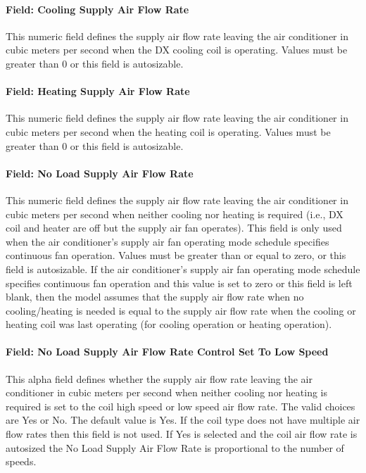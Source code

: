\paragraph{Field: Cooling Supply Air Flow Rate}\label{field-cooling-supply-air-flow-rate-002}

This numeric field defines the supply air flow rate leaving the air conditioner in cubic meters per second when the DX cooling coil is operating. Values must be greater than 0 or this field is autosizable.

\paragraph{Field: Heating Supply Air Flow Rate}\label{field-heating-supply-air-flow-rate-002}

This numeric field defines the supply air flow rate leaving the air conditioner in cubic meters per second when the heating coil is operating. Values must be greater than 0 or this field is autosizable.

\paragraph{Field: No Load Supply Air Flow Rate}\label{field-no-load-supply-air-flow-rate-001}

This numeric field defines the supply air flow rate leaving the air conditioner in cubic meters per second when neither cooling nor heating is required (i.e., DX coil and heater are off but the supply air fan operates). This field is only used when the air conditioner's supply air fan operating mode schedule specifies continuous fan operation. Values must be greater than or equal to zero, or this field is autosizable. If the air conditioner's supply air fan operating mode schedule specifies continuous fan operation and this value is set to zero or this field is left blank, then the model assumes that the supply air flow rate when no cooling/heating is needed is equal to the supply air flow rate when the cooling or heating coil was last operating (for cooling operation or heating operation).

\paragraph{Field: No Load Supply Air Flow Rate Control Set To Low Speed}\label{field-no-load-supply-air-flow-rate-control-set-to-low-speed-001}

This alpha field defines whether the supply air flow rate leaving the air conditioner in cubic meters per second when neither cooling nor heating is required is set to the coil high speed or low speed air flow rate. The valid choices are Yes or No. The default value is Yes. If the coil type does not have multiple air flow rates then this field is not used. If Yes is selected and the coil air flow rate is autosized the No Load Supply Air Flow Rate is proportional to the number of speeds.

